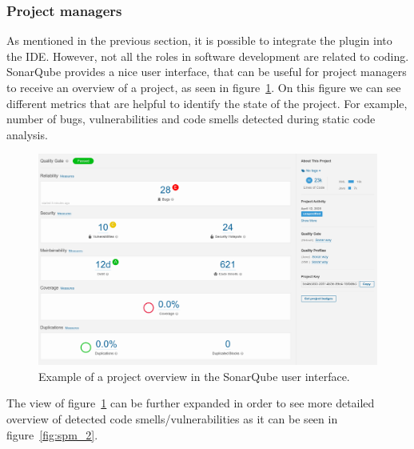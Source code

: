 \FloatBarrier

\subsubsection{Project managers}


As mentioned in the previous section, it is possible to integrate the plugin into the IDE.
However, not all the roles in software development are related to coding.
SonarQube provides a nice user interface, that can be useful for project managers to receive an overview of a project,
as seen in figure~\ref{fig:spm_1}.
On this figure we can see different metrics that are helpful to identify the state of the project.
For example, number of bugs, vulnerabilities and code smells detected during static code analysis.

\begin{figure}
    \includegraphics[scale=0.35]{figures/project_managers_1.png}
    \caption{Example of a project overview in the SonarQube user interface.}
    \label{fig:spm_1}
\end{figure}

The view of figure~\ref{fig:spm_1} can be further expanded in order to see more detailed overview of detected
code smells/vulnerabilities as it can be seen in figure~\ref{fig:spm_2}.

